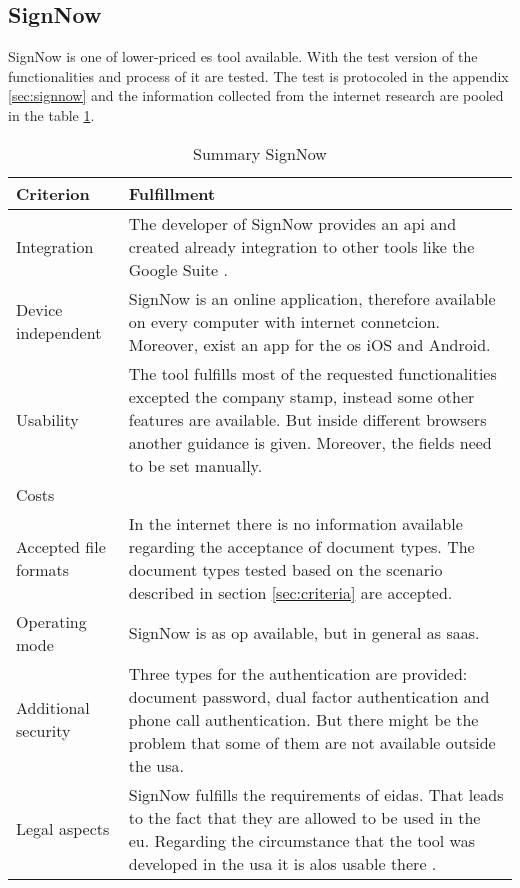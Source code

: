 \subsection{SignNow}
SignNow is one of lower-priced \gls{es} tool available. With the test version of the functionalities and process of it are tested. The test is protocoled in the appendix \ref{sec:signnow} and the information collected from the internet research are pooled in the table \ref{tab:signnow}.
\begin{table}[h!]
	\begin{tabular}{|p{4cm}|p{10cm}|} \hline
		Criterion & Fulfillment \\ \hline
		Integration & The developer of SignNow provides an \gls{api} and created already integration to other tools like the Google Suite \parencite{signnow2018enterprise,signnow2018price}.\\ \hline
		Device independent & SignNow is an online application, therefore available on every computer with internet connetcion. Moreover, exist an \gls{app} for the \gls{os} iOS and Android.\\ \hline
		Usability & The tool fulfills most of the requested functionalities excepted the company stamp, instead some other features are available. But inside different browsers another guidance is given. Moreover, the fields need to be set manually.\\ \hline
		Costs & \\ \hline
		Accepted file formats & In the internet there is no information available regarding the acceptance of document types. The document types tested based on the scenario described in section \ref{sec:criteria} are accepted.\\ \hline
		Operating mode & SignNow is as \gls{op} available, but in general as \gls{saas}. \parencite{signnow2018op} \\ \hline
		Additional security & Three types for the authentication are provided: document password, dual factor authentication and phone call authentication. But there might be the problem that some of them are not available outside the \gls{usa}. \parencite{signnow2018security} \\ \hline
		Legal aspects & SignNow fulfills the requirements of \gls{eidas}. That leads to the fact that they are allowed to be used in the \gls{eu}. Regarding the circumstance that the tool was developed in the \gls{usa} it is alos usable there \parencite{signnow2018legal}. \\ \hline
	\end{tabular}
	\caption{Summary SignNow}
	\label{tab:signnow}
\end{table}

